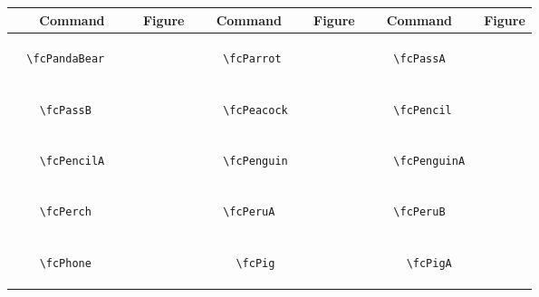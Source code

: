 \documentclass[x11names]{article}
\begin{document}
\begin{table}[H]\centering\begin{tabular}{|c|c|c|c|c|c|}\hline{\bf Command} & {\bf Figure} & {\bf Command} & {\bf Figure} & {\bf Command} & {\bf Figure}\\	\hline	&\multirow{5}{*}{	\fcPandaBear	[scale=0.4]} & &\multirow{5}{*}{	\fcParrot	[scale=0.4]} & &\multirow{5}{*}{	\fcPassA	[scale=0.4]}\\	& & & & & \\	& & & & & \\	\verb|	\fcPandaBear	| & & \verb|	\fcParrot	| & & \verb|	\fcPassA	| & \\	& & & & & \\	& & & & & \\	& & & & & \\	\hline									
		&\multirow{5}{*}{	\fcPassB	[scale=0.4]} & &\multirow{5}{*}{	\fcPeacock	[scale=0.4]} & &\multirow{5}{*}{	\fcPencil	[scale=0.8]}\\	& & & & & \\	& & & & & \\	\verb|	\fcPassB	| & & \verb|	\fcPeacock	| & & \verb|	\fcPencil	| & \\	& & & & & \\	& & & & & \\	& & & & & \\	\hline									
		&\multirow{5}{*}{	\fcPencilA	[scale=0.4]} & &\multirow{5}{*}{	\fcPenguin	[scale=0.4]} & &\multirow{5}{*}{	\fcPenguinA	[scale=0.4]}\\	& & & & & \\	& & & & & \\	\verb|	\fcPencilA	| & & \verb|	\fcPenguin	| & & \verb|	\fcPenguinA	| & \\	& & & & & \\	& & & & & \\	& & & & & \\	\hline									
		&\multirow{5}{*}{	\fcPerch	[scale=0.4]} & &\multirow{5}{*}{	\fcPeruA	[scale=0.4]} & &\multirow{5}{*}{	\fcPeruB	[scale=0.4]}\\	& & & & & \\	& & & & & \\	\verb|	\fcPerch	| & & \verb|	\fcPeruA	| & & \verb|	\fcPeruB	| & \\	& & & & & \\	& & & & & \\	& & & & & \\	\hline									
		&\multirow{5}{*}{	\fcPhone	[scale=0.8]} & &\multirow{5}{*}{	\fcPig	[scale=0.8]} & &\multirow{5}{*}{	\fcPigA	[scale=0.4]}\\	& & & & & \\	& & & & & \\	\verb|	\fcPhone	| & & \verb|	\fcPig	| & & \verb|	\fcPigA	| & \\	& & & & & \\	& & & & & \\	& & & & & \\	\hline									

\end{tabular}
\end{table}
\end{document}
